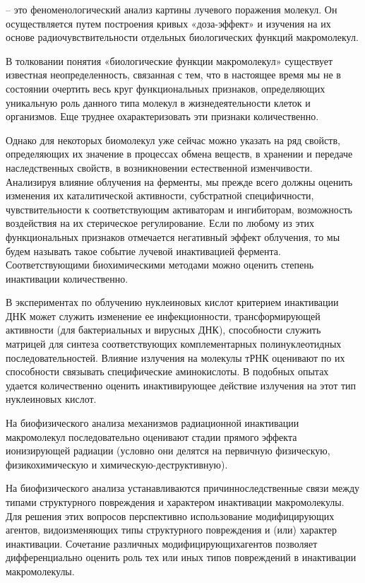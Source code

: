 \documentclass[a4paper, 14pt]{article}
\renewcommand{\emph}[1]{{\color{orange}{\textit{\textbf{#1}}}}}
\begin{document}
\emph{Первый этап} – это феноменологический анализ картины лучевого поражения
молекул. Он осуществляется путем построения кривых «доза-эффект» и изучения на
их основе радиочувствительности отдельных биологических функций макромолекул.

В толковании понятия «биологические функции макромолекул» существует
известная неопределенность, связанная с тем, что в настоящее время мы не в
состоянии очертить весь круг функциональных признаков, определяющих уникальную
роль данного типа молекул в жизнедеятельности клеток и организмов. Еще труднее
охарактеризовать эти признаки количественно.

Однако для некоторых биомолекул уже сейчас можно указать на ряд свойств,
определяющих их значение в процессах обмена веществ, в хранении и передаче
наследственных свойств, в возникновении естественной изменчивости. Анализируя
влияние облучения на ферменты, мы прежде всего должны оценить изменения их
каталитической активности, субстратной специфичности, чувствительности к
соответствующим активаторам и ингибиторам, возможность воздействия на их
стерическое регулирование. Если по любому из этих функциональных признаков
отмечается негативный эффект облучения, то мы будем называть такое событие
лучевой инактивацией фермента. Соответствующими биохимическими методами
можно оценить степень инактивации количественно.

В экспериментах по облучению нуклеиновых кислот критерием инактивации
ДНК может служить изменение ее инфекционности, трансформирующей активности
(для бактериальных и вирусных ДНК), способности служить матрицей для синтеза
соответствующих комплементарных полинуклеотидных последовательностей.
Влияние излучения на молекулы тРНК оценивают по их способности связывать
специфические аминокислоты. В подобных опытах удается количественно оценить
инактивирующее действие излучения на этот тип нуклеиновых кислот.

На \emph{втором этапе} биофизического анализа механизмов радиационной
инактивации макромолекул последовательно оценивают стадии прямого эффекта
ионизирующей радиации (условно они делятся на первичную физическую, физикохимическую и химическую-деструктивную).

На \emph{третьем этапе} биофизического анализа устанавливаются причинноследственные связи между типами структурного повреждения и характером инактивации макромолекулы. Для решения этих вопросов перспективно использование модифицирующих агентов, видоизменяющих типы структурного
повреждения и (или) характер инактивации. Сочетание различных модифицирующихагентов позволяет дифференциально оценить роль тех или иных типов повреждений в
инактивации макромолекулы.
\end{document}
